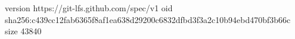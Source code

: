 version https://git-lfs.github.com/spec/v1
oid sha256:c439cc12fab6365f8af1ea638d29200c6832dfbd3f3a2c10b94ebd470bf3b66c
size 43840
